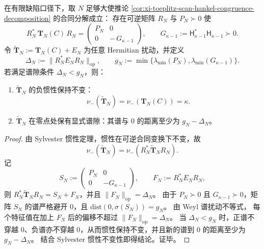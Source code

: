
\begin{theorem}\label{thm:xi-toeplitz-negative-inertia-spectral-gap-stability}
在有限缺陷口径下，取 \(N\) 足够大使推论 \ref{cor:xi-toeplitz-scan-hankel-congruence-decomposition} 的合同分解成立：
存在可逆矩阵 \(R_N\) 与 \(P_N\succ 0\) 使
\[
R_N^{\ast}\,\mathbf{T}_N(C)\,R_N
=
\begin{pmatrix}
P_N & 0\\
0 & -\,G_{\kappa-1}
\end{pmatrix},
\qquad
G_{\kappa-1}:=\mathsf H_{\kappa-1}^{\ast}\mathsf H_{\kappa-1}\succ 0.
\]
令 \(\widetilde{\mathbf{T}}_N:=\mathbf{T}_N(C)+E_N\) 为任意 Hermitian 扰动，并定义
\[
\Delta_N:=\bigl\|R_N^{\ast}E_N R_N\bigr\|_{\mathrm{op}},
\qquad
g_N:=\min\bigl\{\lambda_{\min}(P_N),\lambda_{\min}(G_{\kappa-1})\bigr\}.
\]
若满足谱隙条件 \(\Delta_N<g_N\)，则：
\begin{enumerate}
  \item \(\widetilde{\mathbf{T}}_N\) 的负惯性保持不变：
  \[
  \nu_-(\widetilde{\mathbf{T}}_N)=\nu_-(\mathbf{T}_N(C))=\kappa.
  \]
  \item \(\widetilde{\mathbf{T}}_N\) 在零点处保有显式谱隙：其谱与 \(0\) 的距离至少为 \(g_N-\Delta_N\)。
\end{enumerate}
\end{theorem}
\begin{proof}
由 Sylvester 惯性定理，惯性在可逆合同变换下不变，故
\[
\nu_-(\widetilde{\mathbf{T}}_N)=\nu_-\!\left(R_N^{\ast}\widetilde{\mathbf{T}}_N R_N\right).
\]
记
\[
S_N:=\begin{pmatrix}P_N&0\\0&-G_{\kappa-1}\end{pmatrix},
\qquad
F_N:=R_N^{\ast}E_N R_N,
\]
则 \(R_N^{\ast}\widetilde{\mathbf{T}}_N R_N=S_N+F_N\)，并且 \(\|F_N\|_{\mathrm{op}}=\Delta_N\)。
由于 \(P_N\succ 0\) 且 \(G_{\kappa-1}\succ 0\)，矩阵 \(S_N\) 的谱严格避开 \(0\)，且
\(
\mathrm{dist}(0,\sigma(S_N))=g_N
\)。
由 Weyl 谱扰动不等式，
每个特征值在加上 \(F_N\) 后的偏移不超过 \(\|F_N\|_{\mathrm{op}}=\Delta_N\)。
当 \(\Delta_N<g_N\) 时，正谱不穿越 \(0\)、负谱亦不穿越 \(0\)，从而惯性保持不变，并且新的谱到 \(0\) 的距离至少为 \(g_N-\Delta_N\)。
结合 Sylvester 惯性不变性即得结论。证毕。
\end{proof}

